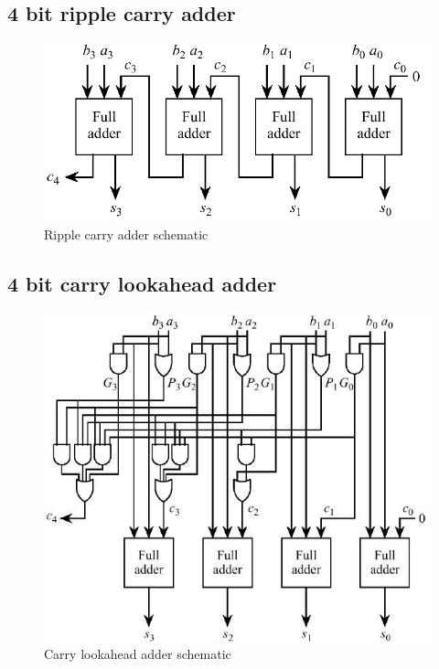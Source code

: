 \documentclass[a4paper]{article}
\begin{document}
    \subsection{4 bit ripple carry adder}
        \begin{figure}[b]
            \centering
            \includegraphics[width=\textwidth]{ripple-carry-adder}
            \caption{Ripple carry adder schematic}
        \end{figure}
        

    \subsection{4 bit carry lookahead adder}
        \begin{figure}[b]
            \centering
            \includegraphics[width=\textwidth]{carry-lookahead-adder}
            \caption{Carry lookahead adder schematic}
        \end{figure}
        
\end{document}

